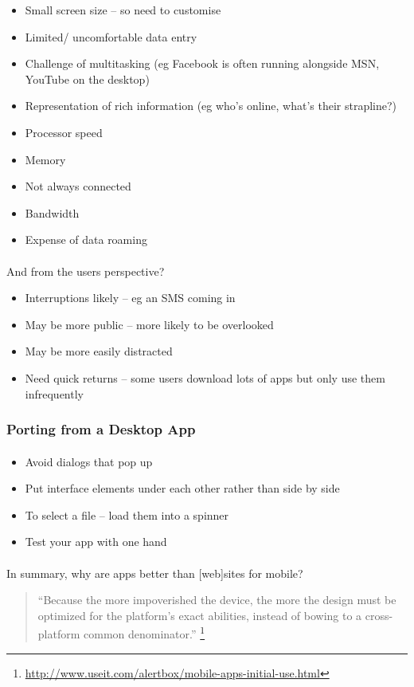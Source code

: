 \documentclass[12pt, a4paper, twoside]{book}
\begin{document}
\begin{itemize}
\item Small screen size – so need to customise
\item Limited/ uncomfortable data entry
\item Challenge of multitasking (eg Facebook is often running alongside MSN, YouTube on the desktop)
\item Representation of rich information (eg who's online, what's their strapline?)
\item Processor speed
\item Memory
\item Not always connected
\item Bandwidth
\item Expense of data roaming
\end{itemize}

\paragraph{} And from the users perspective?

\begin{itemize}
\item Interruptions likely – eg an SMS coming in
\item May be more public – more likely to be overlooked
\item May be more easily distracted
\item Need quick returns – some users download lots of apps but only use them infrequently
\end{itemize}

\subsubsection{Porting from a Desktop App} 
\paragraph{} 

\begin{itemize}
\item Avoid dialogs that pop up
\item Put interface elements under each other rather than side by side
\item To select a file – load them into a spinner
\item Test your app with one hand
\end{itemize}


\paragraph{} In summary, why are apps better than [web]sites for mobile? 
\begin{quote}
``Because the more impoverished the device, the more the design must be optimized for the platform's exact abilities, instead of bowing to a cross-platform common denominator.'' \footnote{\url{http://www.useit.com/alertbox/mobile-apps-initial-use.html}}
\end{quote}
\end{document}

